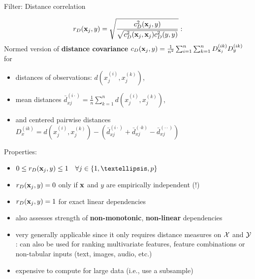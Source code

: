 \documentclass[11pt,compress,t,notes=noshow, xcolor=table]{beamer}
\begin{document}
  \begin{vbframe}{Filter: Distance correlation}

  $$r_D(\mathbf{x}_j, y) = \sqrt{\frac{c_{D}^2(\mathbf{x}_j, y)}{\sqrt{c_{D}^2(\mathbf{x}_j, \mathbf{x}_j) c_{D}^2(y, y)}}}:$$
  Normed version of \textbf{distance covariance} $c_{D}(\mathbf{x}_j, y) = \frac{1}{n^2}\sum^n_{i=1}\sum^n_{k=1} D^{(ik)}_{\mathbf{x}_j} D^{(ik)}_{y}$ for
  \begin{itemize}
  \item distances of observations: $d\left(x^{(i)}_j, x^{(k)}_j\right)$,
  \item mean distances $\bar{d}^{(i\cdot)}_{xj} = \tfrac{1}{n} \sum^n_{k=1} d\left(x^{(i)}_j, x^{(k)}_j\right)$,
  \item and centered pairwise distances
  $D^{(ik)}_{x} = d\left(x^{(i)}_j, x^{(k)}_j\right) - (\bar{d}^{(i\cdot)}_{xj} + \bar{d}^{(\cdot k)}_{xj} - \bar{d}^{(\cdot \cdot)}_{xj})$
  \end{itemize}

  \framebreak

  Properties:
  \begin{itemize}
  \item $0 \leq r_D(\xj, y) \leq 1 \quad \forall  j \in \{1, …, p\}$
  \item $r_D(\mathbf{x}_j, y) = 0$ only if $\mathbf{x}$ and $y$ are empirically independent (!)
  \item $r_D(\mathbf{x}_j, y) = 1$ for exact linear dependencies
  \item also assesses strength of \textbf{non-monotonic}, \textbf{non-linear}  dependencies
  \item very generally applicable since it only requires distance measures on $\mathcal{X}$ and $\mathcal{Y}$: can also be used for ranking multivariate features, feature combinations or non-tabular inputs (text, images, audio, etc.)
  \item expensive to compute for large data (i.e., use a subsample)
  \end{itemize}


\end{vbframe}
\end{document}
